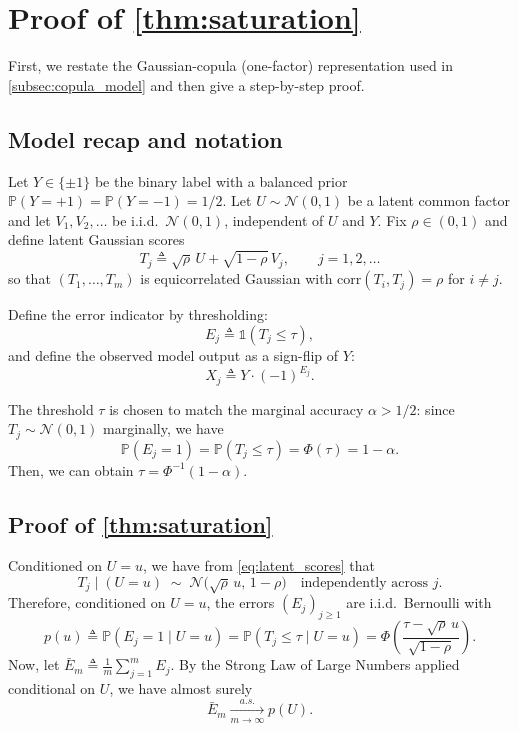 \documentclass{article}
\theoremstyle{plain}
\theoremstyle{definition}
\theoremstyle{remark}
\begin{document}
\newpage
\section{Proof of \cref{thm:saturation}}
\label{sec:proof_saturation}

First, we restate the Gaussian-copula (one-factor) representation used in \cref{subsec:copula_model}
and then give a step-by-step proof.

\subsection{Model recap and notation}

Let $Y\in\{\pm1\}$ be the binary label with a balanced prior $\mathbb{P}(Y=+1)=\mathbb{P}(Y=-1)=1/2$.
Let $U\sim\mathcal{N}(0,1)$ be a latent common factor and let $V_1,V_2,\dots$ be i.i.d.\ $\mathcal{N}(0,1)$,
independent of $U$ and $Y$. Fix $\rho\in(0,1)$ and define latent Gaussian scores
\begin{equation}
\label{eq:latent_scores}
T_j \triangleq \sqrt{\rho}\,U + \sqrt{1-\rho}\,V_j, \qquad j=1,2,\dots
\end{equation}
so that $(T_1,\dots,T_m)$ is equicorrelated Gaussian with $\mathrm{corr}(T_i,T_j)=\rho$ for $i\neq j$.

Define the error indicator by thresholding:
\begin{equation}
\label{eq:error_threshold}
E_j \triangleq \mathds{1}(T_j \le \tau),
\end{equation}
and define the observed model output as a sign-flip of $Y$:
\begin{equation}
\label{eq:output_from_error}
X_j \triangleq Y\cdot (-1)^{E_j}.
\end{equation}

The threshold $\tau$ is chosen to match the marginal accuracy $\alpha>1/2$:
since $T_j\sim\mathcal{N}(0,1)$ marginally, we have
\begin{equation}
\label{eq:tau_accuracy}
\mathbb{P}(E_j=1)=\mathbb{P}(T_j\le \tau)=\Phi(\tau)=1-\alpha.
\end{equation}
Then, we can obtain $\tau=\Phi^{-1}(1-\alpha)$.

\subsection{Proof of \cref{thm:saturation}}
Conditioned on $U=u$, we have from \eqref{eq:latent_scores} that
\[
T_j \mid (U=u)\;\sim\;\mathcal{N}\!\big(\sqrt{\rho}\,u,\,1-\rho\big)
\quad\text{independently across } j.
\]
Therefore, conditioned on $U=u$, the errors $(E_j)_{j\ge1}$ are i.i.d.\ Bernoulli with
\begin{equation}
\label{eq:p_u_def}
p(u)\triangleq \mathbb{P}(E_j=1\mid U=u)
=\mathbb{P}\!\left(T_j\le \tau \mid U=u\right)
=\Phi\!\left(\frac{\tau-\sqrt{\rho}\,u}{\sqrt{1-\rho}}\right).
\end{equation}
Now, let $\bar E_m \triangleq \frac{1}{m}\sum_{j=1}^m E_j$. By the Strong Law of Large Numbers
applied conditional on $U$, we have almost surely
\begin{equation}
\label{eq:slln_errors}
\bar E_m \xrightarrow[m\to\infty]{a.s.} p(U).
\end{equation}
\end{document}
